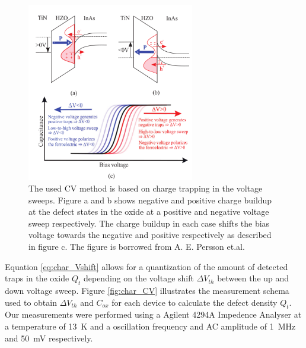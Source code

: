 \documentclass[11pt,twoside]{eitExjobb}
\begin{document}
\begin{figure}[htbp]
    \centering
    \includegraphics[width=0.65\textwidth]{fig/img/CV_hysteresis.png}
    \caption{The used CV method is based on charge trapping in the voltage
        sweeps. Figure a and b shows negative and positive charge buildup at
        the defect states in the oxide at a positive and negative voltage sweep
        respectively. The charge buildup in each case shifts the bias voltage
        towards the negative and positive respectively as described in figure
        c. The figure is borrowed from A. E. Persson et.al. \cite{persson2020method}}
    \label{fig:char_hysteresis}
\end{figure}

Equation \ref{eq:char_Vshift} allows for a quantization of the amount of
detected traps in the oxide $Q_t$ depending on the voltage shift $\Delta
V_{th}$ between the up and down voltage sweep. Figure \ref{fig:char_CV}
illustrates the measurement schema used to obtain $\Delta V_{th}$ and $C_{ox}$
for each device to calculate the defect density $Q_t$. Our measurements were
performed using a Agilent 4294A Impedence Analyser at a temperature of
\SI{13}{\kelvin} and a oscillation frequency and AC amplitude of
\SI{1}{\mega\hertz} and \SI{50}{\milli\volt} respectively.
\end{document}
